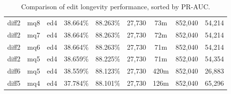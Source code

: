 \begin{sidewaystable}[!ph]
\begin{center}
\begin{tabular}{|c|c|c||c|c||c|c|c|c|}
diff2 & mq8 & ed4 & 38.664\% & 88.263\% & 27,730 & 73m & 852,040 & 54,214 \\
diff2 & mq7 & ed4 & 38.664\% & 88.263\% & 27,730 & 72m & 852,040 & 54,214 \\
diff2 & mq6 & ed4 & 38.664\% & 88.263\% & 27,730 & 71m & 852,040 & 54,214 \\
diff2 & mq5 & ed4 & 38.659\% & 88.225\% & 27,730 & 71m & 852,040 & 54,354 \\
diff6 & mq5 & ed4 & 38.559\% & 88.123\% & 27,730 & 420m & 852,040 & 26,883 \\
diff5 & mq4 & ed4 & 37.784\% & 88.101\% & 27,730 & 126m & 852,040 & 65,296 \\
\hline
\end{tabular}
\end{center}
\caption{Comparison of edit longevity performance,
    sorted by PR-AUC.}
\label{tab:editshoutH}
\end{sidewaystable}
\clearpage
